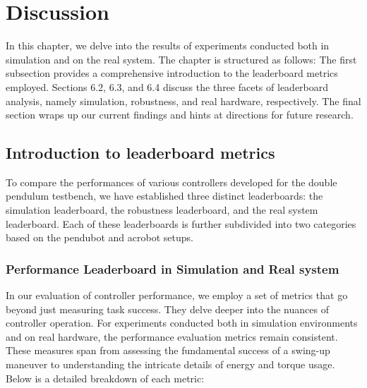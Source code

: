 \chapter{Discussion}
In this chapter, we delve into the results of experiments conducted both in simulation and on the real system. The chapter is structured as follows: The first subsection provides a comprehensive introduction to the leaderboard metrics employed. Sections 6.2, 6.3, and 6.4 discuss the three facets of leaderboard analysis, namely simulation, robustness, and real hardware, respectively. The final section wraps up our current findings and hints at directions for future research.

\section{Introduction to leaderboard metrics}
To compare the performances of various controllers developed for the double pendulum testbench, we have established three distinct leaderboards: the simulation leaderboard, the robustness leaderboard, and the real system leaderboard. Each of these leaderboards is further subdivided into two categories based on the pendubot and acrobot setups.

\subsection{Performance Leaderboard in Simulation and Real system}

In our evaluation of controller performance, we employ a set of metrics that go beyond just measuring task success. They delve deeper into the nuances of controller operation. For experiments conducted both in simulation environments and on real hardware, the performance evaluation metrics remain consistent. These measures span from assessing the fundamental success of a swing-up maneuver to understanding the intricate details of energy and torque usage. Below is a detailed breakdown of each metric:

